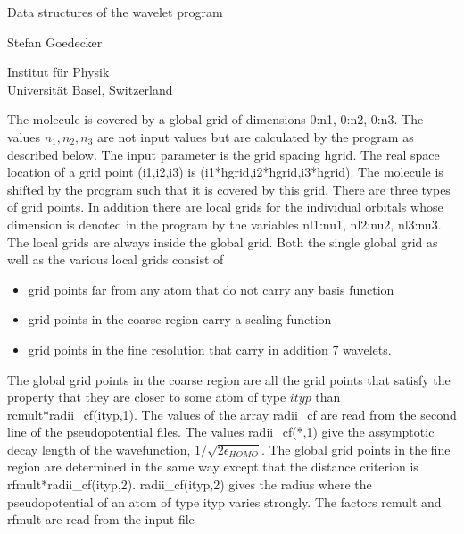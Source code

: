 \documentclass[12pt]{article}
\begin{document}
\setlength{\oddsidemargin}{-.3cm}
\setlength{\topmargin}{-2.cm}

\Large \begin{center}
Data structures of the wavelet program
\end{center} 

\large \begin{center}
Stefan Goedecker
\end{center} 
\normalsize \begin{center}
Institut f\"{u}r Physik \\
Universit\"{a}t Basel, Switzerland \\
\end{center} 

\noindent
The molecule is covered by a global grid of dimensions { \color{red} 0:n1, 0:n2, 0:n3}.
The values $n_1,n_2,n_3$ are not input values but are calculated by the program as described below.
The input parameter is the grid spacing { \color{red} hgrid}. 
The real space location of a grid point (i1,i2,i3) is (i1*hgrid,i2*hgrid,i3*hgrid). 
The molecule is shifted by the program such that it is covered by this grid. There 
are three types of grid points. 
In addition there are local grids for the individual orbitals whose dimension 
is denoted in the program by the variables { \color{red} nl1:nu1, nl2:nu2, nl3:nu3}.
The local grids are always inside the global grid. Both the single global grid as 
well as the various local grids consist of 
\begin{itemize}
\item grid points far from any atom that do not carry any basis function
\item grid points in the coarse region carry a scaling function 
\item grid points in the fine resolution that carry in addition 7 wavelets. 
\end{itemize}

The global grid points in the coarse region are all the grid points that satisfy 
the property that they are closer to some atom of type $ityp$ than 
{ \color{red} rcmult*radii\_cf(ityp,1)}.  The values 
of the array radii\_cf are read from the second line of the pseudopotential files.
The values radii\_cf(*,1) give the assymptotic decay length of the wavefunction, 
$1/\sqrt{2 \epsilon_{HOMO}}$.  The global grid points in the fine region are 
determined in the same way except that the distance 
criterion is { \color{red} rfmult*radii\_cf(ityp,2)}. 
radii\_cf(ityp,2) gives the radius where the 
pseudopotential of an atom of type ityp varies  strongly.
The factors rcmult and rfmult are read from the input file
\end{document}
